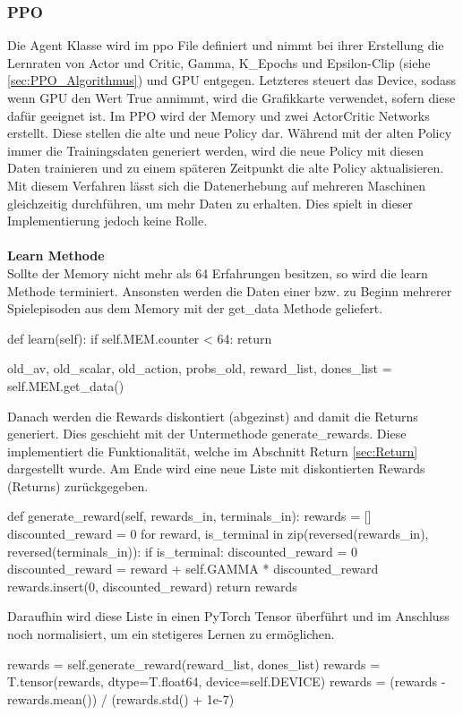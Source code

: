 \subsubsection{PPO}
Die Agent Klasse wird im ppo File definiert und nimmt bei ihrer Erstellung die Lernraten von Actor und Critic, Gamma, K\_Epochs und Epsilon-Clip (siehe \ref{sec:PPO_Algorithmus}) und GPU entgegen. Letzteres steuert das Device, sodass wenn GPU den Wert True annimmt, wird die Grafikkarte verwendet, sofern diese dafür geeignet ist. Im PPO wird der Memory und zwei ActorCritic Networks erstellt. Diese stellen die alte und neue Policy dar. Während mit der alten Policy immer die Trainingsdaten generiert werden, wird die neue Policy mit diesen Daten trainieren und zu einem späteren Zeitpunkt die alte Policy aktualisieren. Mit diesem Verfahren lässt sich die Datenerhebung auf mehreren Maschinen gleichzeitig durchführen, um mehr Daten zu erhalten. Dies spielt in dieser Implementierung jedoch keine Rolle.\\
\\\textbf{Learn Methode}\\
Sollte der Memory nicht mehr als 64 Erfahrungen besitzen, so wird die learn Methode terminiert. Ansonsten werden die Daten einer bzw. zu Beginn mehrerer Spielepisoden aus dem Memory mit der get\_data Methode geliefert.
\begin{python}
    def learn(self):
		if self.MEM.counter < 64:
			return
		
		old_av, old_scalar, old_action, probs_old, reward_list, dones_list = self.MEM.get_data()
\end{python}
Danach werden die Rewards diskontiert (abgezinst) and damit die Returns generiert. Dies geschieht mit der Untermethode generate\_rewards. Diese implementiert die Funktionalität, welche im Abschnitt Return \ref{sec:Return} dargestellt wurde. Am Ende wird eine neue Liste mit diskontierten Rewards (Returns) zurückgegeben.
\begin{python}
	def generate_reward(self, rewards_in, terminals_in):
		rewards = []
		discounted_reward = 0
		for reward, is_terminal in zip(reversed(rewards_in), reversed(terminals_in)):
			if is_terminal:
				discounted_reward = 0
			discounted_reward = reward + self.GAMMA * discounted_reward
			rewards.insert(0, discounted_reward)
		return rewards
\end{python}
Daraufhin wird diese Liste in einen PyTorch Tensor überführt und im Anschluss noch normalisiert, um ein stetigeres Lernen zu ermöglichen.
\begin{python}
	rewards = self.generate_reward(reward_list, dones_list)
	rewards = T.tensor(rewards, dtype=T.float64, device=self.DEVICE)
	rewards = (rewards - rewards.mean()) / (rewards.std() + 1e-7)
\end{python}
